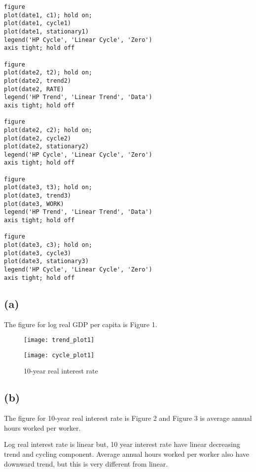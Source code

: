\documentclass[a4paper]{article}
\begin{document}
\begin{verbatim}
figure
plot(date1, c1); hold on;
plot(date1, cycle1)
plot(date1, stationary1)
legend('HP Cycle', 'Linear Cycle', 'Zero')
axis tight; hold off

figure
plot(date2, t2); hold on;
plot(date2, trend2)
plot(date2, RATE)
legend('HP Trend', 'Linear Trend', 'Data')
axis tight; hold off

figure
plot(date2, c2); hold on;
plot(date2, cycle2)
plot(date2, stationary2)
legend('HP Cycle', 'Linear Cycle', 'Zero')
axis tight; hold off

figure
plot(date3, t3); hold on;
plot(date3, trend3)
plot(date3, WORK)
legend('HP Trend', 'Linear Trend', 'Data')
axis tight; hold off

figure
plot(date3, c3); hold on;
plot(date3, cycle3)
plot(date3, stationary3)
legend('HP Cycle', 'Linear Cycle', 'Zero')
axis tight; hold off
\end{verbatim}


\subsection*{(a)}
The figure for log real GDP per capita is Figure 1.





\begin{figure}[htbp]
  \begin{minipage}[b]{0.49\linewidth}
    \centering
    \texttt{[image: trend\_plot1]}
  \end{minipage}
  \begin{minipage}[b]{0.49\linewidth}
    \centering
    \texttt{[image: cycle\_plot1]}
  \end{minipage}
  \caption{10-year real interest rate}
\end{figure}



\subsection*{(b)}

The figure for 10-year real interest rate is Figure 2 and Figure 3 is average annual hours worked per worker.

Log real interest rate is linear but, 10 year interest rate have linear decreasing trend and cycling component. Average annual hours worked per worker also have downward trend, but this is very different from linear.
\color{black}
\end{document}
